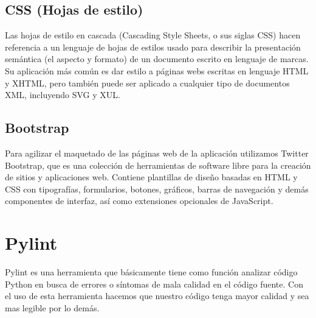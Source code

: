 \subsection{CSS (Hojas de estilo)}
Las hojas de estilo en cascada (Cascading Style Sheets, o sus siglas CSS) hacen referencia a un 
lenguaje de hojas de estilos usado para describir la presentación semántica (el aspecto y formato) de un 
documento escrito en lenguaje de marcas. Su aplicación más común es dar estilo a páginas webs escritas en lenguaje HTML y XHTML, 
pero también puede ser aplicado a cualquier tipo de documentos XML, incluyendo SVG y XUL.

\subsection{Bootstrap}
Para agilizar el maquetado de las páginas web de la aplicación utilizamos Twitter Bootstrap, que es una colección de herramientas de software
libre para la creación de sitios y aplicaciones web. Contiene plantillas de diseño basadas en HTML y CSS con tipografías, 
formularios, botones, gráficos, barras de navegación y demás componentes de interfaz, así como extensiones opcionales de JavaScript.

\section{Pylint}
\label{2:sec8}
Pylint es una herramienta que básicamente tiene como función analizar código Python en busca de errores o síntomas de mala calidad en el código fuente. Con el uso de esta herramienta
hacemos que nuestro código tenga mayor calidad y sea mas legible por lo demás.

